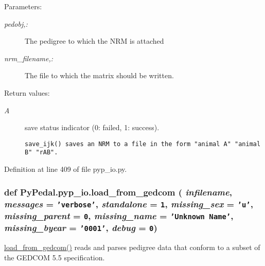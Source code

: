 \begin{Desc}
\item[Parameters:]
\begin{description}
\item[{\em pedobj,:}]The pedigree to which the NRM is attached \item[{\em nrm\_\-filename,:}]The file to which the matrix should be written. \end{description}
\end{Desc}
\begin{Desc}
\item[Return values:]
\begin{description}
\item[{\em A}]save status indicator (0: failed, 1: success).

\footnotesize\begin{verbatim}save_ijk() saves an NRM to a file in the form "animal A" "animal B" "rAB".
\end{verbatim}
\normalsize
 \end{description}
\end{Desc}


Definition at line 409 of file pyp\_\-io.py.\hypertarget{namespacePyPedal_1_1pyp__io_94c9bc92f204b70cb8bedd3b81b9a5bb}{
\subsubsection[load\_\-from\_\-gedcom]{\setlength{\rightskip}{0pt plus 5cm}def Py\-Pedal.pyp\_\-io.load\_\-from\_\-gedcom ( {\em infilename},  {\em messages} = {\tt 'verbose'},  {\em standalone} = {\tt 1},  {\em missing\_\-sex} = {\tt 'u'},  {\em missing\_\-parent} = {\tt 0},  {\em missing\_\-name} = {\tt 'Unknown~Name'},  {\em missing\_\-byear} = {\tt '0001'},  {\em debug} = {\tt 0})}}
\label{namespacePyPedal_1_1pyp__io_94c9bc92f204b70cb8bedd3b81b9a5bb}


\hyperlink{namespacePyPedal_1_1pyp__io_94c9bc92f204b70cb8bedd3b81b9a5bb}{load\_\-from\_\-gedcom()} reads and parses pedigree data that conform to a subset of the GEDCOM 5.5 specification. 

